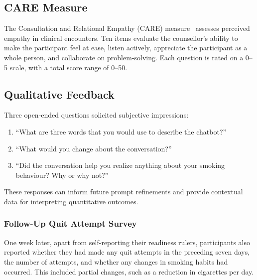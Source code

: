 \subsection{CARE Measure}
\label{subsec:care}
The Consultation and Relational Empathy (CARE) measure~\citep{10.1093/fampra/cmh621,Bikker2015} assesses perceived empathy in clinical encounters. Ten items evaluate the counsellor's ability to make the participant feel at ease, listen actively, appreciate the participant as a whole person, and collaborate on problem-solving. Each question is rated on a 0--5 scale, with a total score range of 0--50.

\subsection{Qualitative Feedback}
Three open-ended questions solicited subjective impressions:
\begin{enumerate}
	\item ``What are three words that you would use to describe the chatbot?''
	\item ``What would you change about the conversation?''
	\item ``Did the conversation help you realize anything about your smoking behaviour? Why or why not?''
\end{enumerate}
These responses can inform future prompt refinements and provide contextual data for interpreting quantitative outcomes.

\subsubsection{Follow-Up Quit Attempt Survey}
One week later, apart from self-reporting their readiness rulers, participants also
reported whether they had made any quit attempts in the preceding seven days, the
number of attempts, and whether any changes in smoking habits had occurred. This
included partial changes, such as a reduction in cigarettes per day.

